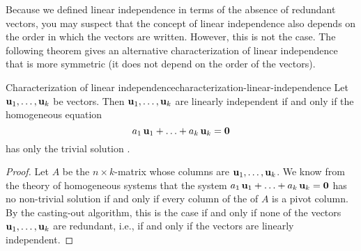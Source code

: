 Because we defined linear independence in terms of the absence of
redundant vectors, you may suspect that the concept of linear
independence also depends on the order in which the vectors are
written. However, this is not the case. The following theorem gives an
alternative characterization of linear independence that is more
symmetric (it does not depend on the order of the vectors).

\begin{theorem}{Characterization of linear independence}{characterization-linear-independence}
  Let $\mbox{\bf u}_1,\ldots,\mbox{\bf u}_k$ be vectors. Then
  $\mbox{\bf u}_1,\ldots,\mbox{\bf u}_k$ are linearly independent%
  if and only if the homogeneous equation
  \begin{equation*}
    a_1\,\mbox{\bf u}_1 + \ldots + a_k\,\mbox{\bf u}_k = \mbox{\bf 0}
  \end{equation*}
  has only the trivial solution%
  .
\end{theorem}

\begin{proof}
  Let $A$ be the $n\times k$-matrix whose columns are
  $\mbox{\bf u}_1,\ldots,\mbox{\bf u}_k$. We know from the theory of
  homogeneous systems that the system
  $a_1\,\mbox{\bf u}_1 + \ldots + a_k\,\mbox{\bf u}_k = \mbox{\bf 0}$ has no
  non-trivial solution if and only if every column of the {\ef} of $A$
  is a pivot column. By the casting-out algorithm, this is the case if
  and only if none of the vectors $\mbox{\bf u}_1,\ldots,\mbox{\bf u}_k$ are
  redundant, i.e., if and only if the vectors are linearly independent.
\end{proof}

